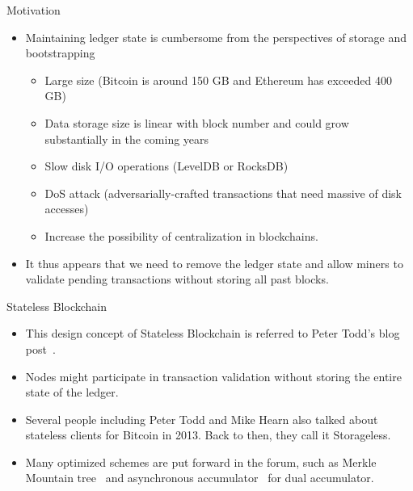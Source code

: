 \documentclass[biblatex,aspectratio=169,11pt]{mybeamer}
\begin{document}
\begin{frame}{Motivation}
  \begin{itemize}
    \item Maintaining ledger state is cumbersome from the perspectives of \alert{storage} and \alert{bootstrapping}
    \begin{itemize}
       \item Large size (Bitcoin is around 150 GB and Ethereum has exceeded 400 GB)
       \item Data storage size is linear with block number and could grow substantially in the coming years
       \item Slow disk I/O operations (LevelDB or RocksDB)
       \item DoS attack (adversarially-crafted transactions that need massive of disk accesses)
       \item Increase the possibility of centralization in blockchains.
    \end{itemize}
    \item It thus appears that we need to remove the \alert{ledger state} and allow miners to validate pending transactions without storing all past blocks. 
  \end{itemize}
\end{frame}

\begin{frame}{Stateless Blockchain}
   \begin{itemize}
    \item This design concept of \alert{Stateless Blockchain} is referred to Peter Todd's blog post~\cite{Tod}. 
    \item Nodes might participate in transaction validation without storing the entire state of the ledger.
    \item Several people including Peter Todd and Mike Hearn also talked about stateless clients for Bitcoin in 2013. Back to then, they call it \alert{Storageless}.
    \item Many optimized schemes are put forward in the forum, such as Merkle Mountain tree~\cite{MMR} and asynchronous accumulator~\cite{reyzin2016efficient} for dual accumulator.
  \end{itemize}
\end{frame}
\end{document}
